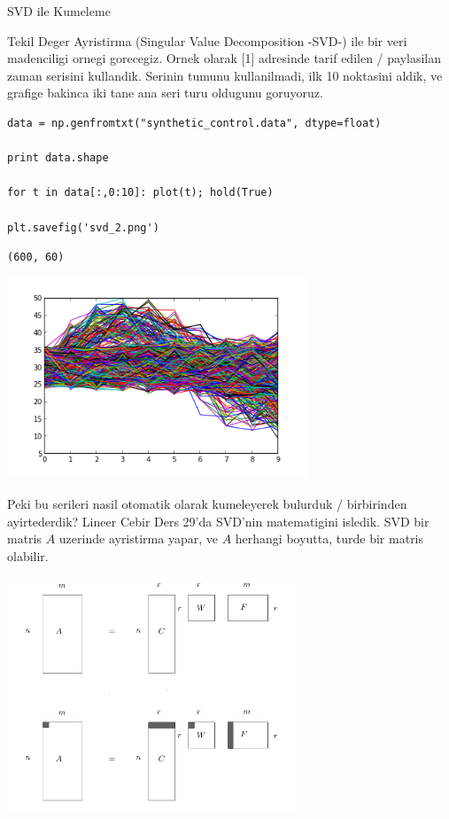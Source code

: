 \documentclass[12pt,fleqn]{article}\usepackage{../common}
\begin{document}
SVD ile Kumeleme

Tekil Deger Ayristirma (Singular Value Decomposition -SVD-) ile bir veri
madenciligi ornegi gorecegiz. Ornek olarak [1] adresinde tarif edilen /
paylasilan zaman serisini kullandik. Serinin tumunu kullanilmadi, ilk 10
noktasini aldik, ve grafige bakinca iki tane ana seri turu oldugunu
goruyoruz.

\begin{verbatim}
data = np.genfromtxt("synthetic_control.data", dtype=float)

print data.shape

for t in data[:,0:10]: plot(t); hold(True)

plt.savefig('svd_2.png')
\end{verbatim}

\begin{verbatim}
(600, 60)
\end{verbatim}

\includegraphics[height=6cm]{svd_2.png}

Peki bu serileri nasil otomatik olarak kumeleyerek bulurduk / birbirinden
ayirtederdik?  Lineer Cebir Ders 29'da SVD'nin matematigini
isledik. SVD bir matris $A$ uzerinde ayristirma yapar, ve $A$ herhangi
boyutta, turde bir matris olabilir.

\includegraphics[height=7cm]{svd_1.png}
\end{document}
